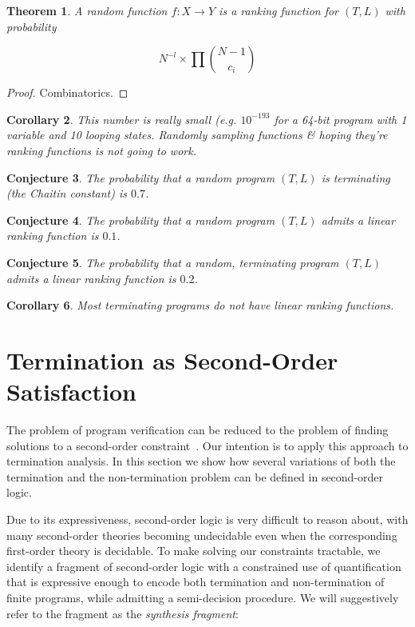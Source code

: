\documentclass[preprint]{sigplanconf}
\newtheorem{theorem}{Theorem}
\newtheorem{corollary}[theorem]{Corollary}
\newtheorem{conjecture}[theorem]{Conjecture}
\theoremstyle{definition}
\begin{document}
\begin{theorem}
 A random function $f : X \to Y$ is a ranking function for $(T, L)$ with probability

 $$N^{-l} \times \prod {{N-1} \choose c_i}$$
\end{theorem}

\begin{proof}
 Combinatorics.
\end{proof}


\begin{corollary}
 This number is really small (e.g. $10^{-193}$ for a 64-bit program with 1 variable and 10 looping states.
 Randomly sampling functions \& hoping they're ranking functions is not going to work.
\end{corollary}


\begin{conjecture}
 The probability that a random program $(T, L)$ is terminating (the Chaitin constant)
 is $0.7$.
\end{conjecture}

\begin{conjecture}
 The probability that a random program $(T, L)$ admits a linear ranking function is
 $0.1$.
\end{conjecture}

\begin{conjecture}
 The probability that a random, terminating program $(T, L)$ admits a linear ranking function
 is $0.2$.
\end{conjecture}


\begin{corollary}
 Most terminating programs do not have linear ranking functions.
\end{corollary}
\fi


\section{Termination as Second-Order Satisfaction} \label{sec:second.order}


The problem of program verification can be reduced to the problem of finding
solutions to a second-order
constraint~\cite{DBLP:conf/pldi/GrebenshchikovLPR12,DBLP:conf/pldi/GulwaniSV08}. 
Our intention is to apply this approach to termination analysis.  In this
section we show how several variations of both the termination and the
non-termination problem can be defined in second-order logic.

Due to its expressiveness, second-order logic is very difficult to reason
about, with many second-order theories becoming undecidable even when the
corresponding first-order theory is decidable.
To make solving our constraints tractable, we identify a fragment of second-order logic
with a constrained use of quantification that is expressive enough to encode
both termination and non-termination of finite programs, while admitting a semi-decision procedure.
We will suggestively refer to the fragment as the \emph{synthesis fragment}:
\end{document}
